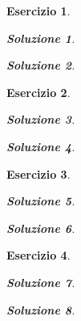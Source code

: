 \documentclass[a4paper]{article}
\theoremstyle{break}
\newtheorem{ex}{{ \Large Esercizio} }
\theoremstyle{plain}
\newtheorem{sol}{Soluzione}[ex]
\begin{document}
\begin{ex}


\begin{sol}

\end{sol}

\begin{sol}

\end{sol}


\end{ex}

\begin{ex}


\begin{sol}

\end{sol}

\begin{sol}

\end{sol}


\end{ex}

\begin{ex}


\begin{sol}

\end{sol}

\begin{sol}

\end{sol}


\end{ex}

\begin{ex}


\begin{sol}

\end{sol}

\begin{sol}

\end{sol}


\end{ex}
\end{document}
